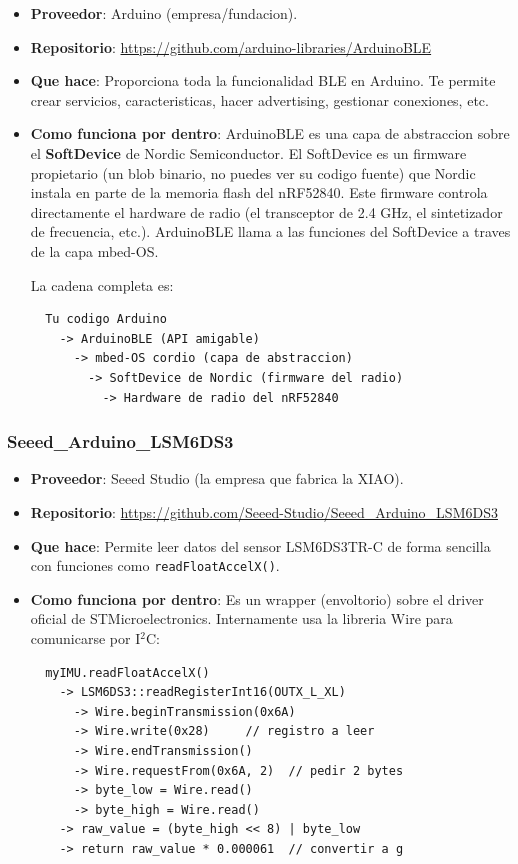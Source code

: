 \documentclass[11pt,a4paper]{article}
\begin{document}
\begin{itemize}
    \item \textbf{Proveedor}: Arduino (empresa/fundacion).
    \item \textbf{Repositorio}:
          \url{https://github.com/arduino-libraries/ArduinoBLE}
    \item \textbf{Que hace}: Proporciona toda la funcionalidad BLE
          en Arduino. Te permite crear servicios, caracteristicas,
          hacer advertising, gestionar conexiones, etc.
    \item \textbf{Como funciona por dentro}: ArduinoBLE es una capa
          de abstraccion sobre el \textbf{SoftDevice} de Nordic
          Semiconductor. El SoftDevice es un firmware propietario
          (un blob binario, no puedes ver su codigo fuente) que
          Nordic instala en parte de la memoria flash del nRF52840.
          Este firmware controla directamente el hardware de radio
          (el transceptor de 2.4 GHz, el sintetizador de frecuencia,
          etc.). ArduinoBLE llama a las funciones del SoftDevice a
          traves de la capa mbed-OS.

          La cadena completa es:

\begin{verbatim}
  Tu codigo Arduino
    -> ArduinoBLE (API amigable)
      -> mbed-OS cordio (capa de abstraccion)
        -> SoftDevice de Nordic (firmware del radio)
          -> Hardware de radio del nRF52840
\end{verbatim}
\end{itemize}

\subsubsection{Seeed\_Arduino\_LSM6DS3}

\begin{itemize}
    \item \textbf{Proveedor}: Seeed Studio (la empresa que fabrica
          la XIAO).
    \item \textbf{Repositorio}:
          \url{https://github.com/Seeed-Studio/Seeed_Arduino_LSM6DS3}
    \item \textbf{Que hace}: Permite leer datos del sensor
          LSM6DS3TR-C de forma sencilla con funciones como
          \texttt{readFloatAccelX()}.
    \item \textbf{Como funciona por dentro}: Es un wrapper (envoltorio)
          sobre el driver oficial de STMicroelectronics. Internamente
          usa la libreria Wire para comunicarse por I$^2$C:

\begin{verbatim}
  myIMU.readFloatAccelX()
    -> LSM6DS3::readRegisterInt16(OUTX_L_XL)
      -> Wire.beginTransmission(0x6A)
      -> Wire.write(0x28)     // registro a leer
      -> Wire.endTransmission()
      -> Wire.requestFrom(0x6A, 2)  // pedir 2 bytes
      -> byte_low = Wire.read()
      -> byte_high = Wire.read()
    -> raw_value = (byte_high << 8) | byte_low
    -> return raw_value * 0.000061  // convertir a g
\end{verbatim}
\end{itemize}
\end{document}
